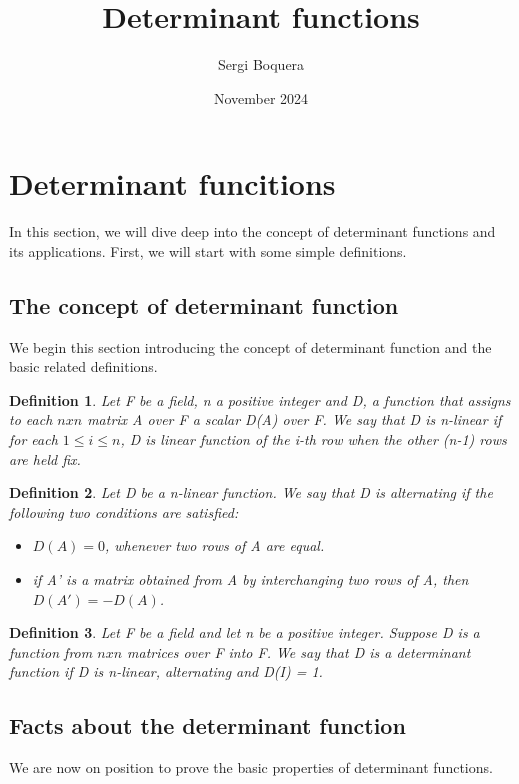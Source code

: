 \documentclass[12pt, letterpaper]{article}
\title{Determinant functions}
\author{Sergi Boquera}
\date{November 2024}
\newtheorem{definition}{Definition}
\begin{document}
	\maketitle
	
	\section{Determinant funcitions}
	In this section, we will dive deep into the concept of determinant functions and its applications. 
	First, we will start with some simple definitions.
	
	
		\subsection{The concept of determinant function}
		
			We begin this section introducing the concept of determinant function and the basic related definitions.
			
			\begin{definition}
				Let F be a field, n a positive integer and D, a function that assigns to each $nxn$ matrix A over F a scalar D(A) over F.
				We say that D is n-linear if for each $1 \le i \le n$, D is linear function of the i-th row when the other (n-1) rows are held fix.
			\end{definition}
			
			\begin{definition}
				Let D be a n-linear function. We say that D is alternating if the following two conditions are satisfied:
				\begin{itemize}
					\item $D(A) = 0$, whenever two rows of A are equal.
					\item  if A' is a matrix obtained from A by interchanging two rows of A, then $D(A') = -D(A)$.
				\end{itemize}
			\end{definition}
			\begin{definition}
				Let F be a field and let n be a positive integer. Suppose D is a function from $nxn$ matrices over F into F. We say that D is a determinant function if D is n-linear, alternating and D(I) = 1.
			\end{definition}
		
		\subsection{Facts about the determinant function}
			We are now on position to prove the basic properties of determinant functions.
			
\end{document}
